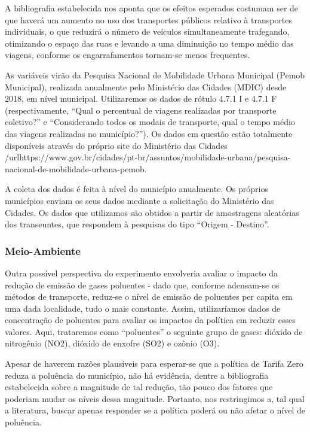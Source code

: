 A bibliografia estabelecida nos aponta que os efeitos esperados costumam ser de que haverá um aumento no uso dos transportes públicos relativo à transportes individuais, o que reduzirá o número de veículos simultaneamente trafegando, otimizando o espaço das ruas e levando a uma diminuição no tempo médio das viagens, conforme os engarrafamentos tornam-se menos frequentes.

As variáveis virão da Pesquisa Nacional de Mobilidade Urbana Municipal (Pemob Municipal), realizada anualmente pelo Ministério das Cidades (MDIC) desde 2018, em nível municipal. Utilizaremos os dados de rótulo 4.7.1 I e 4.7.1 F (respectivamente, “Qual o percentual de viagens realizadas por transporte coletivo?” e “Considerando todos os modais de transporte, qual o tempo médio das viagens realizadas no município?”). Os dados em questão estão totalmente disponíveis através do próprio site do Ministério das Cidades /url{https://www.gov.br/cidades/pt-br/assuntos/mobilidade-urbana/pesquisa-nacional-de-mobilidade-urbana-pemob}.

A coleta dos dados é feita à nível do município anualmente. Os próprios municípios enviam os seus dados mediante a solicitação do Ministério das Cidades. Os dados que utilizamos são obtidos a partir de amostragens aleatórias dos transeuntes, que respondem à pesquisas do tipo “Origem - Destino”.

\subsubsection{Meio-Ambiente}
Outra possível perspectiva do experimento envolveria avaliar o impacto da redução de emissão de gases poluentes - dado que, conforme adensam-se os métodos de transporte, reduz-se o nível de emissão de poluentes per capita em uma dada localidade, tudo o mais constante. Assim, utilizaríamos dados de concentração de poluentes para avaliar os impactos da política em reduzir esses valores. Aqui, trataremos como “poluentes” o seguinte grupo de gases: dióxido de nitrogênio (NO2), dióxido de enxofre (SO2) e ozônio (O3).

Apesar de haverem razões plausíveis para esperar-se que a política de Tarifa Zero reduza a poluência do município, não há evidência, dentre a bibliografia estabelecida sobre a magnitude de tal redução, tão pouco dos fatores que poderiam mudar os níveis dessa magnitude. Portanto, nos restringimos a, tal qual a literatura, buscar apenas responder se a política poderá ou não afetar o nível de poluência.

